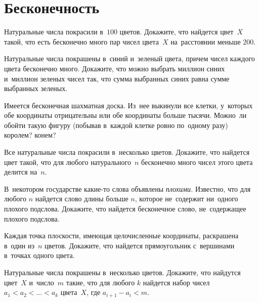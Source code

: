 
\section*{Бесконечность}


\begin{problems}

\item
Натуральные числа покрасили в~$100$ цветов.
Докажите, что найдется цвет~$X$ такой, что есть бесконечно много пар чисел
цвета~$X$ на~расстоянии меньше $200$.

\item
Натуральные числа покрашены в~синий и~зеленый цвета, причем чисел каждого цвета
бесконечно много.
Докажите, что можно выбрать миллион синих и~миллион зеленых чисел так, что
сумма выбранных синих равна сумме выбранных зеленых.

\item
Имеется бесконечная шахматная доска.
Из~нее выкинули все клетки, у~которых обе координаты отрицательны или обе
координаты больше тысячи.
Можно~ли обойти такую фигуру (побывав в~каждой клетке ровно по~одному разу)
\\
\subproblem королем?
\qquad
\subproblem конем?

\item
Все натуральные числа покрасили в~несколько цветов.
Докажите, что найдется цвет такой, что для любого натурального~$n$ бесконечно
много чисел этого цвета делится на~$n$.

\item
В~некотором государстве какие-то слова объявлены \emph{плохими.}
Известно, что для любого $n$ найдется слово длины больше $n$, которое
не~содержит ни~одного плохого подслова.
Докажите, что найдется бесконечное слово, не~содержащее плохого подслова.

\item
Каждая точка плоскости, имеющая целочисленные координаты, раскрашена в~один
из~$n$ цветов.
Докажите, что найдется прямоугольник с~вершинами в~точках одного цвета.

\item
Натуральные числа покрашены в~несколько цветов.
Докажите, что найдутся цвет~$X$ и~число~$m$ такие, что для любого $k$ найдется
набор чисел $a_{1} < a_{2} < \ldots < a_{k}$ цвета~$X$, где
$a_{i+1} - a_{i} < m$.

\end{problems}

